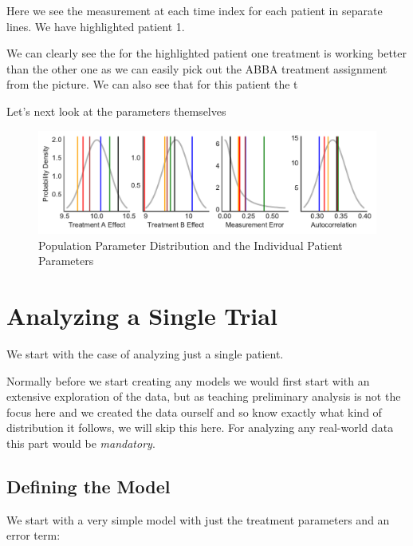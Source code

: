 \documentclass[12pt,a4paper,leqno]{report}
\theoremstyle{plain}
\theoremstyle{definition}
\theoremstyle{remark}
\begin{document}
Here we see the measurement at each time index for each patient in separate lines. We
have highlighted patient 1.

We can clearly see the for the highlighted
patient one treatment is working better than the other one as we can easily pick out the
ABBA treatment assignment from the picture. We can also see that for this patient the t

Let's next look at the parameters themselves

\begin{figure}[!h]
    \caption{Population Parameter Distribution and the Individual Patient Parameters}
    \includegraphics[width=\textwidth,height=\textheight,keepaspectratio]{population_parameter_distributions.pdf}
\end{figure}

\section{Analyzing a Single Trial}\label{1trial}


We start with the case of analyzing just a single patient.


Normally before we start creating any models we would first start with an extensive
exploration of the data, but as teaching preliminary analysis
is not the focus here and we created the data ourself and so know exactly what kind
of distribution it follows, we will skip this here. For analyzing any real-world data
this part would be \emph{mandatory}.

\subsection{Defining the Model}

We start with a very simple model with just the treatment parameters and an error term:
\end{document}
